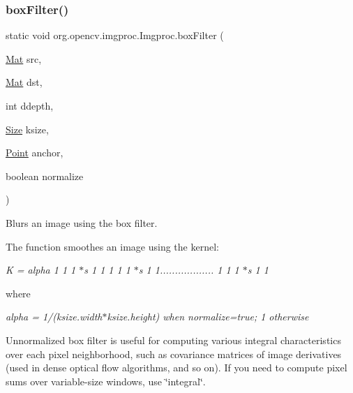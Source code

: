 \subsubsection{\texorpdfstring{box\+Filter()}{boxFilter()}\hspace{0.1cm}{\footnotesize\ttfamily [2/3]}}
{\footnotesize\ttfamily static void org.\+opencv.\+imgproc.\+Imgproc.\+box\+Filter (\begin{DoxyParamCaption}\item[{\mbox{\hyperlink{classorg_1_1opencv_1_1core_1_1_mat}{Mat}}}]{src,  }\item[{\mbox{\hyperlink{classorg_1_1opencv_1_1core_1_1_mat}{Mat}}}]{dst,  }\item[{int}]{ddepth,  }\item[{\mbox{\hyperlink{classorg_1_1opencv_1_1core_1_1_size}{Size}}}]{ksize,  }\item[{\mbox{\hyperlink{classorg_1_1opencv_1_1core_1_1_point}{Point}}}]{anchor,  }\item[{boolean}]{normalize }\end{DoxyParamCaption})\hspace{0.3cm}{\ttfamily [static]}}

Blurs an image using the box filter.

The function smoothes an image using the kernel\+:

{\itshape K = alpha 1 1 1 $\ast$s 1 1 1 1 1 $\ast$s 1 1.................. 1 1 1 $\ast$s 1 1 }

where

{\itshape alpha = 1/(ksize.\+width$\ast$ksize.height) when normalize=true; 1 otherwise}

Unnormalized box filter is useful for computing various integral characteristics over each pixel neighborhood, such as covariance matrices of image derivatives (used in dense optical flow algorithms, and so on). If you need to compute pixel sums over variable-\/size windows, use \char`\"{}integral\char`\"{}.


